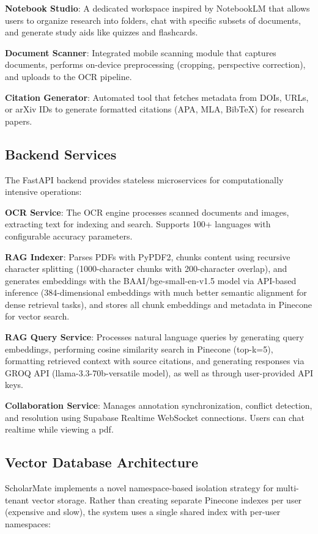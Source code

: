 \documentclass[conference]{IEEEtran}
\begin{document}
\textbf{Notebook Studio}: A dedicated workspace inspired by NotebookLM that allows users to organize research into folders, chat with specific subsets of documents, and generate study aids like quizzes and flashcards.

\textbf{Document Scanner}: Integrated mobile scanning module that captures documents, performs on-device preprocessing (cropping, perspective correction), and uploads to the OCR pipeline.

\textbf{Citation Generator}: Automated tool that fetches metadata from DOIs, URLs, or arXiv IDs to generate formatted citations (APA, MLA, BibTeX) for research papers.

\subsection{Backend Services}

The FastAPI backend provides stateless microservices for computationally intensive operations:

\textbf{OCR Service}: The OCR engine processes scanned documents and images, extracting text for indexing and search. Supports 100+ languages with configurable accuracy parameters.

\textbf{RAG Indexer}: Parses PDFs with PyPDF2, chunks content using recursive character splitting (1000-character chunks with 200-character overlap), and generates embeddings with the BAAI/bge-small-en-v1.5 model via API-based inference (384-dimensional embeddings with much better semantic alignment for dense retrieval tasks), and stores all chunk embeddings and metadata in Pinecone for vector search.


\textbf{RAG Query Service}: Processes natural language queries by generating query embeddings, performing cosine similarity search in Pinecone (top-k=5), formatting retrieved context with source citations, and generating responses via GROQ API (llama-3.3-70b-versatile model), as well as through user-provided API keys.

\textbf{Collaboration Service}: Manages annotation synchronization, conflict detection, and resolution using Supabase Realtime WebSocket connections. Users can chat realtime while viewing a pdf.

\subsection{Vector Database Architecture}

ScholarMate implements a novel namespace-based isolation strategy for multi-tenant vector storage. Rather than creating separate Pinecone indexes per user (expensive and slow), the system uses a single shared index with per-user namespaces:
\end{document}
